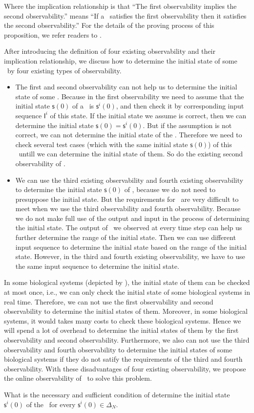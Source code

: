Where the implication relationship is that ``The first observability implies the second observability.'' means ``If a \BCN\ satisfies the first observability then it satisfies the second observability.'' For the details of the proving process of this proposition, we refer readers to \cite{Zhang2016Observability}.
   
After introducing the definition of four existing observability and their implication relationship, we discuss how to determine the initial state of some \BCNs\ by four existing types of observability. 
\begin{itemize}
\item The first and second observability can not help us to determine the initial state of some \BCNs. Because in the first observability we need to assume that the initial state $\mathsf{s}(0)$ of a \BCN\ is $\mathsf{s}^{i}(0)$, and then check it by corresponding input sequence $\mathsf{I}^{i}$ of this state. If the initial state we assume is correct, then we can determine the initial state $\mathsf{s}(0)=\mathsf{s}^{i}(0)$. But if the assumption is not correct, we can not determine the initial state of the \BCN. Therefore we need to check several test cases (which with the same initial state $\mathsf{s}(0)$) of this \BCN\ untill we can determine the initial state of them. So do the existing second observability of \BCNs.
\item We can use the third existing observability and fourth existing observability to determine the initial state $\mathsf{s}(0)$ of \BCNs, because we do not need to presuppose the initial state. But the requirements for \BCNs\ are very difficult to meet when we use the third observability and fourth observability. Because we do not make full use of the output and input in the process of determining the initial state. The output of \BCNs\ we observed at every time step can help us further determine the range of the initial state. Then we can use different input sequence to determine the initial state based on the range of the initial state. However, in the third and fourth existing observability, we have to use the same input sequence to determine the initial state.
\end{itemize} 
 
In some biological systems (depicted by \BCNs), the initial state of them can be checked at most once, i.e., we can only check the initial state of some biological systems in real time. Therefore, we can not use the first observability and second observability to determine the initial states of them. Moreover, in some biological systems, it would takes many costs to check these biological systems. Hence we will spend a lot of overhead to determine the initial states of them by the first observability and second observability. Furthermore, we also can not use the third observability and fourth observability to determine the initial states of some biological systems if they do not satify the requirements of the third and fourth observability. With these disadvantages of four existing observability, we propose the online observability of \BCNs\ to solve this problem.

 \begin{problem}
\label{pro:2}
What is the necessary and sufficient condition of determine the initial state $\mathsf{s}^{i}(0)$ of the \BCN\ for every $\mathsf{s}^{i}(0)\in\Delta_N$.
\end{problem}